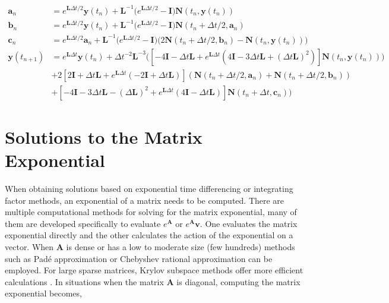 \begin{equation}
\begin{split}
     \boldsymbol{a}_{n} &= e^{\boldsymbol{L}\Delta t/2}\boldsymbol{y}(t_{n}) + \boldsymbol{L}^{-1}\big(e^{\boldsymbol{L}\Delta t/2} - \boldsymbol{I} \big)\boldsymbol{N}(t_{n},\boldsymbol{y}(t_{n})) \\
    \boldsymbol{b}_{n} &= e^{\boldsymbol{L}\Delta t/2}\boldsymbol{y}(t_{n}) + \boldsymbol{L}^{-1}\big(e^{\boldsymbol{L}\Delta t/2} - \boldsymbol{I} \big)\boldsymbol{N}(t_{n}+\Delta t/2,\boldsymbol{a}_{n}) \\
     \boldsymbol{c}_{n} &= e^{\boldsymbol{L}\Delta t/2}\boldsymbol{a}_{n} + \boldsymbol{L}^{-1}\big(e^{\boldsymbol{L}\Delta t/2} - \boldsymbol{I} \big)\big(2\boldsymbol{N}(t_{n}+\Delta t/2,\boldsymbol{b} _{n}) - \boldsymbol{N}(t_{n},\boldsymbol{y}(t_{n}))\big) \\
     \boldsymbol{y}(t_{n+1}) &= e^{\boldsymbol{L}\Delta t}\boldsymbol{y}(t_{n}) + \Delta t^{-2}\boldsymbol{L}^{-3}\big([-4\boldsymbol{I} - \Delta t\boldsymbol{L} + e^{\boldsymbol{L}\Delta t}(4\boldsymbol{I} -3\Delta t\boldsymbol{L} + (\Delta t\boldsymbol{L})^{2})]\boldsymbol{N}(t_{n}, \boldsymbol{y}(t_{n}))) \\
     &+ 2[2\boldsymbol{I} + \Delta t\boldsymbol{L} + e^{\boldsymbol{L}\Delta t}(-2\boldsymbol{I} + \Delta t\boldsymbol{L})](\boldsymbol{N}(t_{n} + \Delta t/2, \boldsymbol{a}_{n}) + \boldsymbol{N}(t_{n} + \Delta t/2, \boldsymbol{b}_{n})) \\
     &+ [-4\boldsymbol{I} - 3\Delta t\boldsymbol{L} - (\Delta\boldsymbol{L})^{2} + e^{\boldsymbol{L}\Delta t}(4\boldsymbol{I} - \Delta t\boldsymbol{L})]\boldsymbol{N}(t_{n}+\Delta t, \boldsymbol{c}_{n})\big)
\end{split}
\end{equation}



\section{Solutions to the Matrix Exponential}
When obtaining solutions based on exponential time differencing or integrating factor methods, an exponential of a matrix needs to be computed. There are multiple computational methods for solving for the matrix exponential, many of them are developed specifically to evaluate $e^{\boldsymbol{A}}$ or $e^{\boldsymbol{A}}\boldsymbol{v}$. One evaluates the matrix exponential directly and the other calculates the action of the exponential on a vector. When $\boldsymbol{A}$ is dense or has a low to moderate size (few hundreds) methods such as Pad\'e approximation or Chebyshev rational approximation can be employed. For large sparse matrices, Krylov subspace methods offer more efficient calculations \cite{exokit}. In situations when the matrix $\boldsymbol{A}$ is diagonal, computing the matrix exponential becomes,


